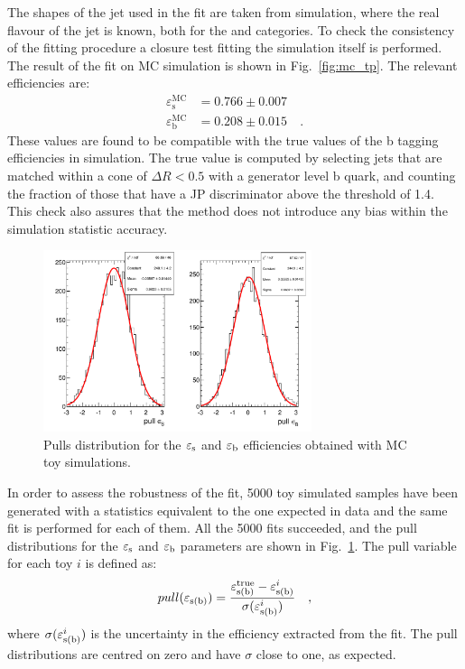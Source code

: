 The \pt shapes of the \probe jet used in the fit are taken from simulation, where the real flavour of the jet is known, both for the \tpp and \tfp categories. To check the consistency of the fitting procedure a closure test fitting the simulation itself is performed.
The result of the fit on MC simulation is shown in Fig.~\ref{fig:mc_tp}. The relevant efficiencies are:
\begin{equation}
\begin{split}
\varepsilon_\mathrm{s}^\mathrm{MC} &= 0.766\pm0.007 \\
\varepsilon_\mathrm{b}^\mathrm{MC} &= 0.208\pm0.015 \quad .
\end{split}
\end{equation}
These values are found to be compatible with the true values of the b tagging efficiencies in simulation. The true value is computed by selecting jets that are matched within a cone of $\Delta{R}<0.5$ with a generator level b quark, and counting the fraction of those that have a JP discriminator above the threshold of 1.4. This check also assures that the \tp method does not introduce any bias within the simulation statistic accuracy.

\begin{figure}[htb]
\centering
\includegraphics[width=0.7\textwidth]{images/pulls_mc.pdf}
\caption{Pulls distribution for the $\varepsilon_{\rm s}$ and $\varepsilon_{\rm b}$ efficiencies obtained with MC toy simulations.\label{fig:pullstp}}
\end{figure}

In order to assess the robustness of the fit, 5000 toy simulated samples have been generated with a statistics equivalent to the one expected in data and the same fit is performed for each of them. All the 5000 fits succeeded, and the pull distributions for the $\varepsilon_{\rm s}$ and $\varepsilon_{\rm b}$ parameters are shown in Fig.~\ref{fig:pullstp}. The pull variable for each toy $i$ is defined as:
\begin{equation}
pull(\varepsilon_{\rm s (b)}) = \frac{\varepsilon_{\rm s (b)}^{\rm true} - \varepsilon_{\rm s (b)}^{i}}{\sigma(\varepsilon_{\rm s (b)}^{i})} \quad,
\end{equation}
\noindent where $\sigma(\varepsilon_{\rm s (b)}^{i})$ is the uncertainty in the efficiency extracted from the fit. The pull distributions are centred on zero and have $\sigma$ close to one, as expected.

